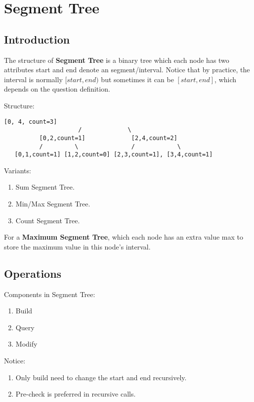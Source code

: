\section{Segment Tree}
\subsection{Introduction}
The structure of \textbf{Segment Tree} is a binary tree which each node has two attributes start and end denote an segment/interval. Notice that by practice, the interval is normally $[start, end)$ but sometimes it can be $[start, end]$, which depends on the question definition. 

Structure:  
\begin{lstlisting}[columns=flexible]
                     [0, 4, count=3]
                     /             \
          [0,2,count=1]             [2,4,count=2]
          /         \               /            \
   [0,1,count=1] [1,2,count=0] [2,3,count=1], [3,4,count=1]
\end{lstlisting}

Variants:
\begin{enumerate}
\item Sum Segment Tree.
\item Min/Max Segment Tree.
\item Count Segment Tree. 
\end{enumerate}

For a \textbf{Maximum Segment Tree}, which each node has an extra value max
to store the maximum value in this node's interval.

\subsection{Operations}
Components in Segment Tree:
\begin{enumerate}
\item Build
\item Query 
\item Modify 
\end{enumerate}

Notice:
\begin{enumerate}
\item Only build need to change the start and end recursively.
\item Pre-check is preferred in recursive calls.
\end{enumerate}


